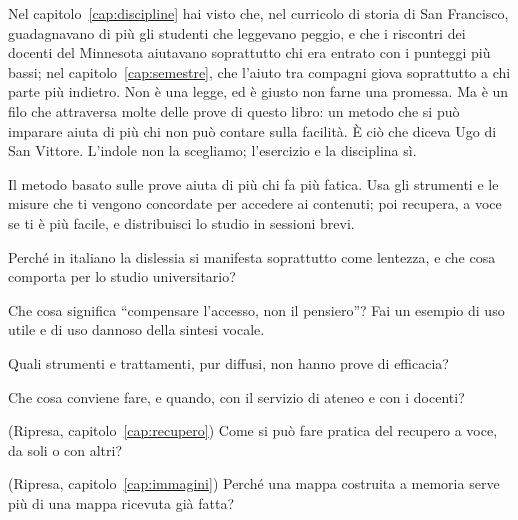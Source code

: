Nel capitolo~\ref{cap:discipline} hai visto che, nel curricolo di
storia di San Francisco, guadagnavano di più gli studenti che
leggevano peggio, e che i riscontri dei docenti del Minnesota
aiutavano soprattutto chi era entrato con i punteggi più bassi; nel
capitolo~\ref{cap:semestre}, che l'aiuto tra compagni giova
soprattutto a chi parte più indietro. Non è una legge, ed è giusto
non farne una promessa. Ma è un filo che attraversa molte delle prove
di questo libro: un metodo che si può imparare aiuta di più chi non
può contare sulla facilità. È ciò che diceva Ugo di San Vittore. L'indole
non la scegliamo; l'esercizio e la disciplina sì.

\begin{daricordare}
Il metodo basato sulle prove aiuta di più chi fa più fatica. Usa gli strumenti e le misure che ti vengono concordate per accedere ai contenuti; poi
recupera, a voce se ti è più facile, e distribuisci lo studio in
sessioni brevi.
\end{daricordare}

\begin{domande}
  \item Perché in italiano la dislessia si manifesta soprattutto come
        lentezza, e che cosa comporta per lo studio universitario?
  \item Che cosa significa \enquote{compensare l'accesso, non il
        pensiero}? Fai un esempio di uso utile e di uso dannoso della
        sintesi vocale.
  \item Quali strumenti e trattamenti, pur diffusi, non hanno prove di
        efficacia?
  \item Che cosa conviene fare, e quando, con il servizio di ateneo e
        con i docenti?
  \item (Ripresa, capitolo~\ref{cap:recupero}) Come si può fare pratica
        del recupero a voce, da soli o con altri?
  \item (Ripresa, capitolo~\ref{cap:immagini}) Perché una mappa
        costruita a memoria serve più di una mappa ricevuta già fatta?
\end{domande}

